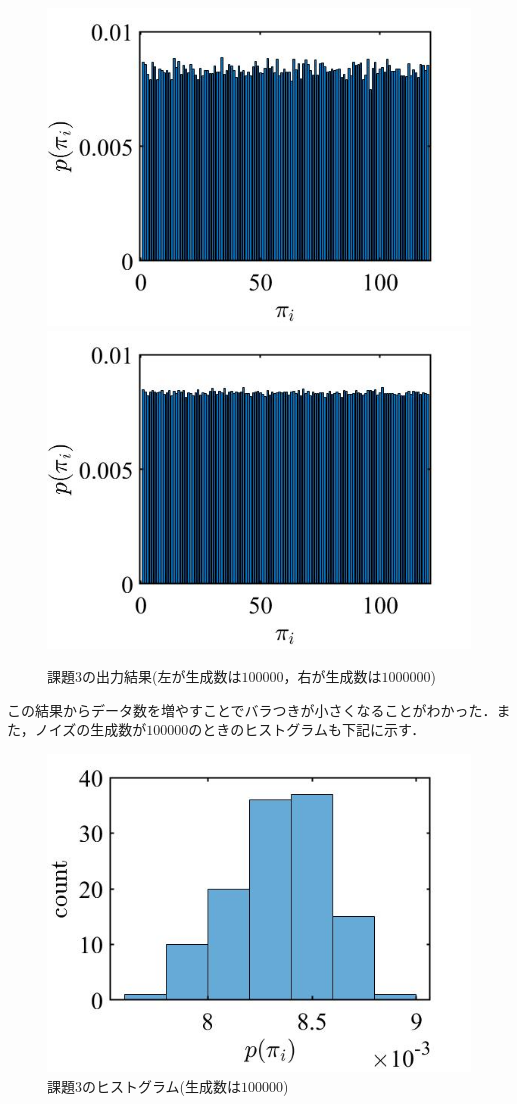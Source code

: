 \documentclass[autodetect-engine,dvipdfmx-if-dvi,ja=standard,a4paper,11pt]{bxjsarticle} %
\begin{document}
\begin{figure}[H]%
\begin{center}
\includegraphics[width=.4\textwidth]{kadai3_result2.jpg}
\includegraphics[width=.4\textwidth]{kadai3_result3.jpg}
\end{center}
\caption{課題3の出力結果(左が生成数は$100000$，右が生成数は$1000000$)}%
\label{fig:kadai3_2}
\end{figure}

この結果からデータ数を増やすことでバラつきが小さくなることがわかった．また，ノイズの生成数が$100000$のときのヒストグラムも下記に示す．

\begin{figure}[H]%
\begin{center}
\includegraphics[width=.4\textwidth]{kadai3_histo.jpg}
\end{center}
\caption{課題3のヒストグラム(生成数は$100000$)}%
\label{fig:kadai3_3}
\end{figure}

\end{document}
